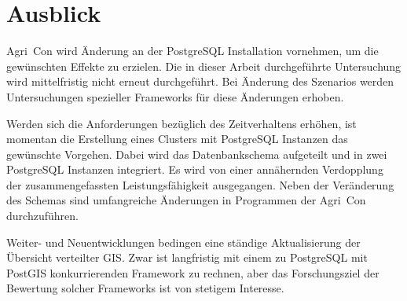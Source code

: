 \section{Ausblick}

Agri~Con wird Änderung an der PostgreSQL Installation vornehmen, um die gewünschten Effekte zu erzielen.
Die in dieser Arbeit durchgeführte Untersuchung wird mittelfristig nicht erneut durchgeführt.
Bei Änderung des Szenarios werden Untersuchungen spezieller Frameworks für diese Änderungen erhoben.

Werden sich die Anforderungen bezüglich des Zeitverhaltens erhöhen, ist momentan die Erstellung eines Clusters mit PostgreSQL Instanzen das gewünschte Vorgehen.
Dabei wird das Datenbankschema aufgeteilt und in zwei PostgreSQL Instanzen integriert.
Es wird von einer annähernden Verdopplung der zusammengefassten Leistungsfähigkeit ausgegangen.
Neben der Veränderung des Schemas sind umfangreiche Änderungen in Programmen der Agri~Con durchzuführen.

Weiter- und Neuentwicklungen bedingen eine ständige Aktualisierung der Übersicht verteilter GIS.
Zwar ist langfristig mit einem zu PostgreSQL mit PostGIS konkurrierenden Framework zu rechnen, aber das Forschungsziel der Bewertung solcher Frameworks ist von stetigem Interesse.

\label{LastPage}